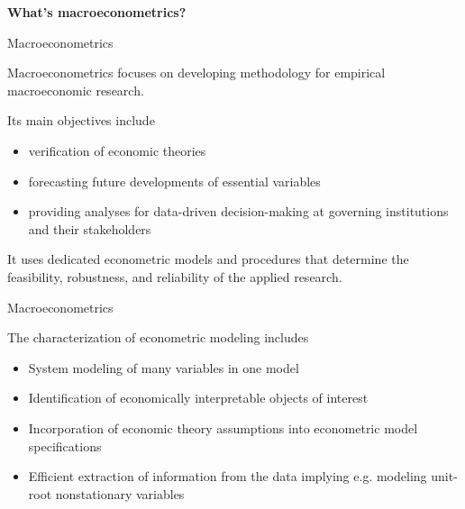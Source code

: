 \documentclass[notes,blackandwhite,mathsans]{beamer}
\begin{document}
{
\begin{frame}

\begin{adjustwidth}{-0.5cm}{0cm}
\vspace{8.3cm}\Large
\textbf{{\color{mcxs3}What's} {\color{mcxs1}macroeconometrics?}}
\end{adjustwidth}

\end{frame}
}






\begin{frame}{\color{mcxs2}Macroeconometrics}

Macroeconometrics focuses on developing methodology for empirical macroeconomic research.

\bigskip Its main objectives include 
\begin{itemize}
\item {\color{mcxs1}verification of economic theories}
\item {\color{mcxs1}forecasting future developments of essential variables}
\item {\color{mcxs1}providing analyses for data-driven decision-making at governing institutions and their stakeholders}
\end{itemize}

\bigskip It uses dedicated econometric models and procedures that determine the feasibility, robustness, and reliability of the applied research.

\end{frame}



{
\begin{frame}{\color{mcxs2}Macroeconometrics}

The characterization of econometric modeling includes

\smallskip
\begin{itemize}
\item {\color{mcxs1}System modeling} {\color{mcxs2}of many variables in one model}
\item {\color{mcxs1}Identification} {\color{mcxs2}of economically interpretable objects of interest}
\item {\color{mcxs1}Incorporation of economic theory assumptions} {\color{mcxs2}into econometric model specifications}
\item {\color{mcxs1}Efficient extraction of information} {\color{mcxs2}from the data implying e.g. modeling unit-root nonstationary variables}
\end{itemize}
\end{frame}
}
\end{document}
